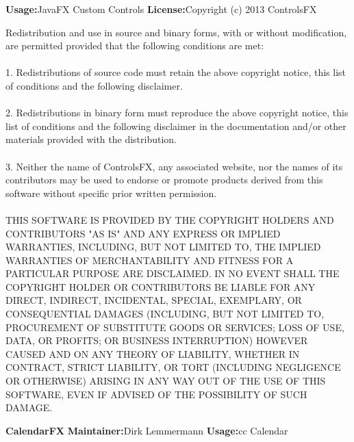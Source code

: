 {\bfseries Usage:}{\space JavaFX Custom Controls}
\newline
\newline
{\bfseries License:}{\space Copyright (c) 2013 ControlsFX}
\newline
\begin{addmargin}[4.5em]{0em}
    \fontsize{10pt}{12pt}\selectfont
    Redistribution and use in source and binary forms, with or without
    modification, are permitted provided that the following conditions are met:
    \\ \\
    1. Redistributions of source code must retain the above copyright notice, this
    list of conditions and the following disclaimer.
    \\ \\
    2. Redistributions in binary form must reproduce the above copyright notice,
    this list of conditions and the following disclaimer in the documentation
    and/or other materials provided with the distribution.
    \\ \\
    3. Neither the name of ControlsFX, any associated website, nor the names of its
    contributors may be used to endorse or promote products derived from
    this software without specific prior written permission.
    \\ \\
    \uppercase{THIS SOFTWARE IS PROVIDED BY THE COPYRIGHT HOLDERS AND CONTRIBUTORS "AS IS"
    AND ANY EXPRESS OR IMPLIED WARRANTIES, INCLUDING, BUT NOT LIMITED TO, THE
    IMPLIED WARRANTIES OF MERCHANTABILITY AND FITNESS FOR A PARTICULAR PURPOSE ARE
    DISCLAIMED. IN NO EVENT SHALL THE COPYRIGHT HOLDER OR CONTRIBUTORS BE LIABLE
    FOR ANY DIRECT, INDIRECT, INCIDENTAL, SPECIAL, EXEMPLARY, OR CONSEQUENTIAL
    DAMAGES (INCLUDING, BUT NOT LIMITED TO, PROCUREMENT OF SUBSTITUTE GOODS OR
    SERVICES; LOSS OF USE, DATA, OR PROFITS; OR BUSINESS INTERRUPTION) HOWEVER
    CAUSED AND ON ANY THEORY OF LIABILITY, WHETHER IN CONTRACT, STRICT LIABILITY,
    OR TORT (INCLUDING NEGLIGENCE OR OTHERWISE) ARISING IN ANY WAY OUT OF THE USE
    OF THIS SOFTWARE, EVEN IF ADVISED OF THE POSSIBILITY OF SUCH DAMAGE.}
\end{addmargin}
\newpage
{\bfseries CalendarFX}
\newline
\newline
{\bfseries Maintainer:}{\space Dirk Lemmermann}
\newline
\newline
{\bfseries Usage:}{\space \acrfull{cc} Calendar}

